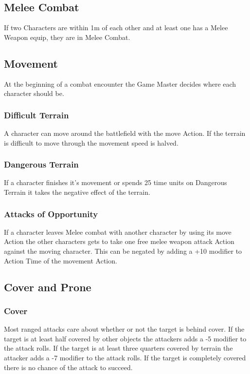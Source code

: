 \documentclass[a4paper,12pt,oneside]{book}
\begin{document}
            \subsection{Melee Combat}
                If two Characters are within 1m of each other and at least one has a Melee Weapon equip, they are in Melee Combat.

            \hypertarget{Movement}{\subsection{Movement}}
                At the beginning of a combat encounter the Game Master decides where each character should be.

                \subsubsection{Difficult Terrain}
                A character can move around the battlefield with the move Action. If the terrain is difficult to move through the movement speed is halved.

                \subsubsection{Dangerous Terrain}
                If a character finishes it's movement or spends 25 time units on Dangerous Terrain it takes the negative effect of the terrain.

                \subsubsection{Attacks of Opportunity}
                If a character leaves Melee combat with another character by using its move Action the other characters gets to take one free melee weapon attack Action against the moving character. This can be negated by adding a +10 modifier to Action Time of the movement Action.

            \subsection{Cover and Prone}
                \subsubsection{Cover}
                Most ranged attacks care about whether or not the target is behind cover. If the target is at least half covered by other objects the attackers adds a -5 modifier to the attack rolls. If the target is at least three quarters covered by terrain the attacker adds a -7 modifier to the attack rolls. If the target is completely covered there is no chance of the attack to succeed.
\end{document}
